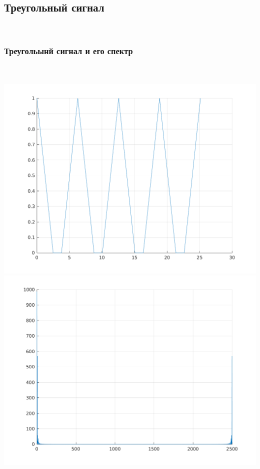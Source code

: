 \documentclass[a4paper]{article}
\begin{document}
\subsection{Треугольный сигнал}\\
\subsubsection{Треугольынй сигнал и его спектр}\\
\\
\includegraphics[scale=0.7]{lab3/figures/figure_12.png}\\
\includegraphics[scale=0.7]{lab3/figures/figure_13.png}\\
\end{document}
